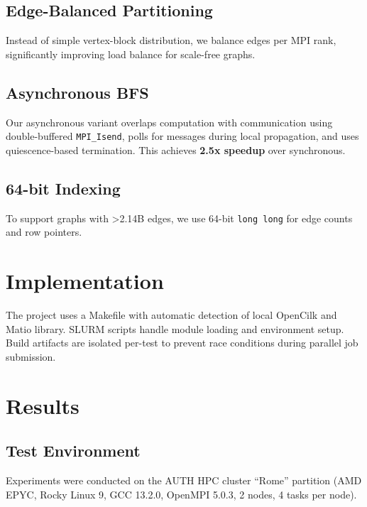\documentclass[11pt,a4paper]{article}
\begin{document}
\subsection{Edge-Balanced Partitioning}
Instead of simple vertex-block distribution, we balance edges per MPI rank, significantly improving load balance for scale-free graphs.

\subsection{Asynchronous BFS}
Our asynchronous variant overlaps computation with communication using double-buffered \texttt{MPI\_Isend}, polls for messages during local propagation, and uses quiescence-based termination. This achieves \textbf{2.5x speedup} over synchronous.

\subsection{64-bit Indexing}
To support graphs with >2.14B edges, we use 64-bit \texttt{long long} for edge counts and row pointers.

\section{Implementation}

The project uses a Makefile with automatic detection of local OpenCilk and Matio library. SLURM scripts handle module loading and environment setup. Build artifacts are isolated per-test to prevent race conditions during parallel job submission.
\section{Results}

\subsection{Test Environment}
Experiments were conducted on the AUTH HPC cluster ``Rome'' partition (AMD EPYC, Rocky Linux 9, GCC 13.2.0, OpenMPI 5.0.3, 2 nodes, 4 tasks per node).
\end{document}
